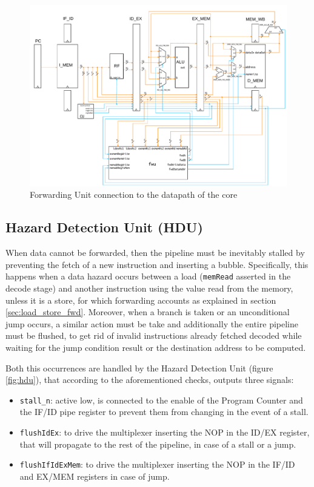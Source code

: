 \documentclass[a4paper]{article}
\begin{document}
\begin{figure}[hbtp]
    \centering
    \includegraphics[width=\textwidth]{../fwu/ref/schematic/fwu_5stages.pdf}
    \caption{Forwarding Unit connection to the datapath of the core}
    \label{fig:fwu_5stages}
\end{figure}

\subsection{Hazard Detection Unit (HDU)}
\label{sec:HDU}
When data cannot be forwarded, then the pipeline must be inevitably stalled by preventing the fetch of a new instruction and inserting a bubble. Specifically, this happens when a data hazard occurs between a load (\texttt{memRead} asserted in the decode stage) and another instruction using the value read from the memory, unless it is a store, for which forwarding accounts as explained in section \ref{sec:load_store_fwd}. Moreover, when a branch is taken or an unconditional jump occurs, a similar action must be take and additionally the entire pipeline must be flushed, to get rid of invalid instructions already fetched decoded while waiting for the jump condition result or the destination address to be computed.

Both this occurrences are handled by the Hazard Detection Unit (figure \ref{fig:hdu}), that according to the aforementioned checks, outputs three signals:
\begin{itemize}
    \item \texttt{stall\_n}: active low, is connected to the enable of the Program Counter and the IF/ID pipe register to prevent them from changing in the event of a stall.
    \item \texttt{flushIdEx}: to drive the multiplexer inserting the NOP in the ID/EX register, that will propagate to the rest of the pipeline, in case of a stall or a jump.
    \item \texttt{flushIfIdExMem}: to drive the multiplexer inserting the NOP in the IF/ID and EX/MEM registers in case of jump.
\end{itemize}
\end{document}
